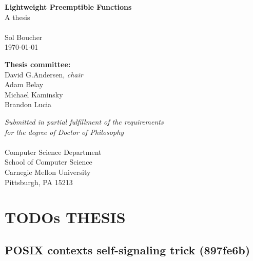 \documentclass[12pt,letterpaper,openright]{report}
\begin{document}
\begin{titlepage}
\begin{center}
	\vspace*{\fill}

	\textbf{\Large Lightweight Preemptible Functions} \\
	A thesis \\
	\hfill \\
	{\large Sol Boucher} \\
	\today \\

	\vspace{1in}

	\textbf{Thesis committee:} \\
	David G.\@ Andersen, \textit{chair} \\
	Adam Belay \\
	Michael Kaminsky \\
	Brandon Lucia \\

	\vspace{\fill}

	\textit{Submitted in partial fulfillment of the requirements \\
	for the degree of Doctor of Philosophy} \\
	\hfill \\
	Computer Science Department \\
	School of Computer Science \\
	Carnegie Mellon University \\
	Pittsburgh, PA 15213 \\
\end{center}
\end{titlepage}

\tableofcontents
\listoffigures
\listoftables
\lstlistoflistings
\newpage
{}

\chapter*{TODOs THESIS}

\section{POSIX contexts self-signaling trick (897fe6b)}
\end{document}
